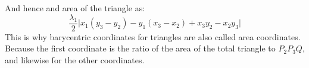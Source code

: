 And hence and area of the triangle as:
\[\frac{\lambda_1}{2}\big|x_1(y_3-y_2)-y_1(x_3-x_2)+x_3y_2-x_2y_3\big|\]
This is why barycentric coordinates for triangles are also called area coordinates.
Because the first coordinate is the ratio of the area of the total triangle to $P_2P_3Q$,
and likewise for the other coordinates.
\\


%
